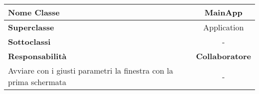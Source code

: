
\setcounter{table}{0}
\begin{table}[H]
    \centering
    \begin{tabular}{||   l  ||  c   ||}
        \rowcolor{Gray}
        \hline
        \textbf{Nome Classe} & MainApp\\
        \hline
        \textbf{Superclasse}  &  Application \\
        \hline
        \textbf{Sottoclassi} & - \\
        \hline
        \hline
         \textbf{Responsabilità} & \textbf{Collaboratore} \\
         \hline
          Avviare con i giusti parametri la finestra con la prima schermata & - \\
         \hline
    \end{tabular}
\end{table}

    
       
